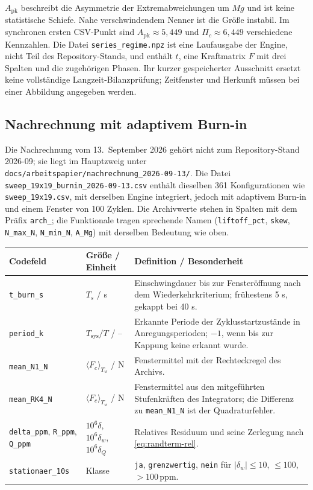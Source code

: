 \documentclass[11pt,a4paper]{article}
\begin{document}
$A_{\mathrm{pk}}$ beschreibt die Asymmetrie der Extremabweichungen um $Mg$ und ist keine statistische Schiefe. Nahe verschwindendem Nenner ist die Größe instabil. Im synchronen ersten CSV-Punkt sind $A_{\mathrm{pk}}\approx5{,}449$ und $\Pi_c\approx6{,}449$ verschiedene Kennzahlen.
Die Datei \texttt{series\_regime.npz} ist eine Laufausgabe der Engine, nicht Teil des Repository-Stands, und enthält $t$, eine Kraftmatrix $F$ mit drei Spalten und die zugehörigen Phasen. Ihr kurzer gespeicherter Ausschnitt ersetzt keine vollständige Langzeit-Bilanzprüfung; Zeitfenster und Herkunft müssen bei einer Abbildung angegeben werden.

\subsection{Nachrechnung mit adaptivem Burn-in}\label{app:nachrechnung}
Die Nachrechnung vom 13.~September 2026 gehört nicht zum Repository-Stand 2026-09; sie liegt im Hauptzweig unter \texttt{docs/arbeitspapier/nachrechnung\_2026-09-13/}. Die Datei \texttt{sweep\_19x19\_burnin\_2026-09-13.csv} enthält dieselben 361 Konfigurationen wie \texttt{sweep\_19x19.csv}, mit derselben Engine integriert, jedoch mit adaptivem Burn-in und einem Fenster von 100 Zyklen. Die Archivwerte stehen in Spalten mit dem Präfix \texttt{arch\_}; die Funktionale tragen sprechende Namen (\texttt{liftoff\_pct}, \texttt{skew}, \texttt{N\_max\_N}, \texttt{N\_min\_N}, \texttt{A\_Mg}) mit derselben Bedeutung wie oben.
\begin{longtable}{@{}L{.24\textwidth}L{.24\textwidth}L{.47\textwidth}@{}}
\toprule\textbf{Codefeld}&\textbf{Größe / Einheit}&\textbf{Definition / Besonderheit}\\\midrule\endhead
\texttt{t\_burn\_s}&$T_s$ / s&Einschwingdauer bis zur Fensteröffnung nach dem Wiederkehrkriterium; frühestens 5 s, gekappt bei 40 s.\\
\texttt{period\_k}&$T_{\mathrm{sys}}/T$ / --&Erkannte Periode der Zyklusstartzustände in Anregungsperioden; $-1$, wenn bis zur Kappung keine erkannt wurde.\\
\texttt{mean\_N1\_N}&$\langle F_c\rangle_{T_w}$ / N&Fenstermittel mit der Rechteckregel des Archivs.\\
\texttt{mean\_RK4\_N}&$\langle F_c\rangle_{T_w}$ / N&Fenstermittel aus den mitgeführten Stufenkräften des Integrators; die Differenz zu \texttt{mean\_N1\_N} ist der Quadraturfehler.\\
\texttt{delta\_ppm}, \texttt{R\_ppm}, \texttt{Q\_ppm}&$10^6\delta$, $10^6\delta_w$, $10^6\delta_Q$&Relatives Residuum und seine Zerlegung nach \eqref{eq:randterm-rel}.\\
\texttt{stationaer\_10s}&Klasse&\texttt{ja}, \texttt{grenzwertig}, \texttt{nein} für $|\delta_w|\le10$, $\le100$, $>100\,\mathrm{ppm}$.\\
\bottomrule\end{longtable}
\end{document}
